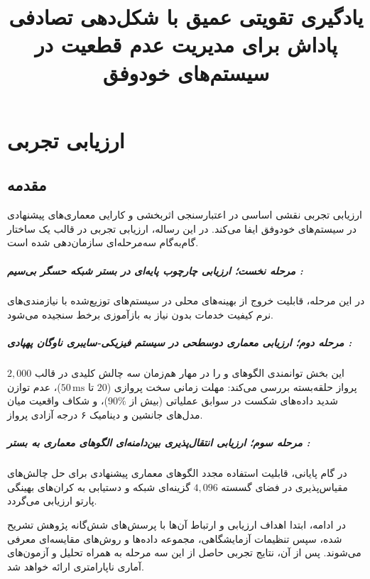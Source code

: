 \documentclass[oneside,openany,phd]{TMU-Thesis}
\title{یادگیری تقویتی عمیق با شکل‌دهی تصادفی پاداش برای مدیریت عدم قطعیت در سیستم‌های خودوفق}
\begin{document}
\AutoPersianDigits
{}

\setcounter{chapter}{4}

\chapter{ارزیابی تجربی}
\label{chap:evaluation}
\section{مقدمه}

ارزیابی تجربی نقشی اساسی در اعتبارسنجی اثربخشی و کارایی معماری‌های پیشنهادی در سیستم‌های خودوفق ایفا می‌کند. در این رساله، ارزیابی تجربی در قالب یک ساختار گام‌به‌گام سه‌مرحله‌ای سازمان‌دهی شده است.

\paragraph{مرحله نخست؛ ارزیابی چارچوب پایه‌ای  در بستر شبکه حسگر بی‌سیم  \cite{gerostathopoulos2019deltaiot}:} در این مرحله، قابلیت خروج از بهینه‌های محلی در سیستم‌های توزیع‌شده با نیازمندی‌های نرم کیفیت خدمات بدون نیاز به بازآموزی برخط سنجیده می‌شود.

\paragraph{مرحله دوم؛ ارزیابی معماری دوسطحی \rsdrlplus در سیستم فیزیکی-سایبری ناوگان پهپادی  \cite{MorenoDART2019}:} این بخش توانمندی الگوهای \sgos و \caepv را در مهار هم‌زمان سه چالش کلیدی در قالب $2{,}000$ پرواز حلقه‌بسته بررسی می‌کند: مهلت زمانی سخت پروازی ($20$ تا $50\,\text{ms}$)، عدم توازن شدید داده‌های شکست در سوابق عملیاتی (بیش از $90\%$)، و شکاف واقعیت میان مدل‌های جانشین و دینامیک ۶ درجه آزادی پرواز.

\paragraph{مرحله سوم؛ ارزیابی انتقال‌پذیری بین‌دامنه‌ای الگوهای معماری به بستر :} در گام پایانی، قابلیت استفاده مجدد الگوهای معماری پیشنهادی برای حل چالش‌های مقیاس‌پذیری در فضای گسسته $4{,}096$ گزینه‌ای شبکه  و دستیابی به کران‌های بهینگی پارتو ارزیابی می‌گردد.

در ادامه، ابتدا اهداف ارزیابی و ارتباط آن‌ها با پرسش‌های شش‌گانه پژوهش تشریح شده، سپس تنظیمات آزمایشگاهی، مجموعه داده‌ها و روش‌های مقایسه‌ای معرفی می‌شوند. پس از آن، نتایج تجربی حاصل از این سه مرحله به همراه تحلیل و آزمون‌های آماری ناپارامتری ارائه خواهد شد.
\end{document}
